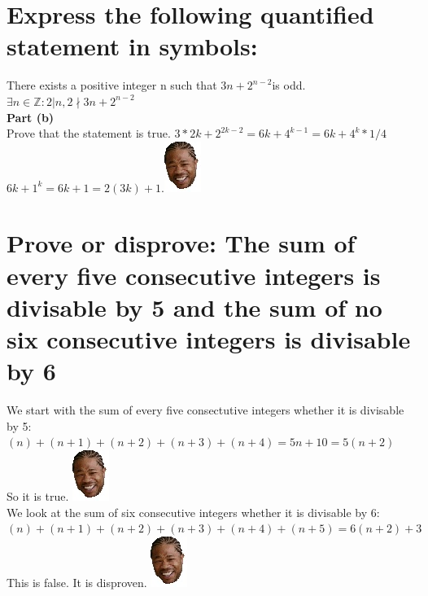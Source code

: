\section{Express the following quantified statement in symbols:}
There exists a positive integer n such that $3n+2^{n-2}$is odd.\\
$\exists n \in \mathbb{Z} : 2|n, 2\nmid 3n+2^{n-2}$\\
\textbf{Part (b)} \\
Prove that the statement is true.
$3*2k+2^{2k-2} = 6k+4^{k-1} = 6k+4^k*1/4$\\
$6k+1^k = 6k + 1 = 2(3k) + 1$.\includegraphics[scale=0.70]{billeder/xzibit}


\section{Prove or disprove: The sum of every five consecutive integers is divisable by 5 and the sum of no six consecutive integers is divisable by 6}
We start with the sum of every five consectutive integers whether it is divisable by 5:\\
$(n)+(n+1)+(n+2)+(n+3)+(n+4) = 5n+10 = 5(n+2)$\\
So it is true. \includegraphics[scale=0.70]{billeder/xzibit}\\
We look at the sum of six consecutive integers whether it is divisable by 6:\\
$(n)+(n+1)+(n+2)+(n+3)+(n+4)+(n+5) = 6(n+2)+3$\\
This is false. It is disproven. \includegraphics[scale=0.70]{billeder/xzibit}\\


